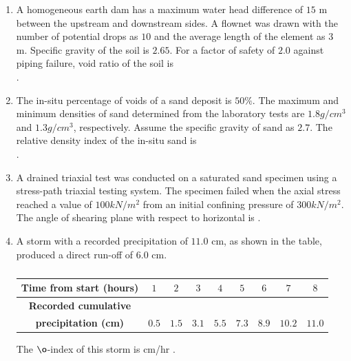 \documentclass[journal,12pt,onecolumn]{article}
\theoremstyle{remark}
\begin{document}
\begin{enumerate}
    \hfill{}

    \item A homogeneous earth dam has a maximum water head difference of $15$ m between
    the upstream and downstream sides. A flownet was drawn with the number of
    potential drops as $10$ and the average length of the element as $3$ m. Specific gravity
    of the soil is $2.65$. For a factor of safety of $2.0$ against piping failure, void ratio of
    the soil is \underline{\hspace{2cm}} \\
    .
    
    \hfill{}
    
    \item The in-situ percentage of voids of a sand deposit is $50\%$. The maximum and
    minimum densities of sand determined from the laboratory tests are $1.8 g/cm^3$ and
    $1.3 g/cm^3$, respectively. Assume the specific gravity of sand as $2.7$.
    The relative density index of the in-situ sand is \underline{\hspace{2cm}} \\ .
    
    \hfill{}

    \item A drained triaxial test was conducted on a saturated sand specimen using a
    stress-path triaxial testing system. The specimen failed when the axial stress reached
    a value of $100 kN/m^2$ from an initial confining pressure of $300 kN/m^2$.
    The angle of shearing plane  with respect to horizontal is
    \underline{\hspace{2cm}} .
    
    \hfill{}
    
    \item A storm with a recorded precipitation of $11.0$ cm, as shown in the table, produced a
    direct run-off of $6.0$ cm.
    \begin{table}[H]
        \centering
        \begin{tabular}{|c|c|c|c|c|c|c|c|c|}
        \hline
        \textbf{Time from start (hours)} & $1$ & $2$ & $3$ & $4$ & $5$ & $6$ & $7$ & $8$ \\ \hline
        \textbf{Recorded cumulative} & & & & & & & & \\
        \textbf{precipitation (cm)} & $0.5$ & $1.5$ & $3.1$ & $5.5$ & $7.3$ & $8.9$ & $10.2$ & $11.0$ \\ \hline
        \end{tabular}
        \caption{}
        \label{tab:q56}
    \end{table}
    The $\o$-index of this storm is \underline{\hspace{2cm}} cm/hr .
    

\end{enumerate}
\end{document}
